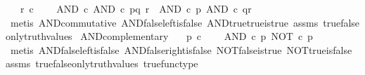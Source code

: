 \begin{isabellebody}
\ \ \ {\isachardoublequoteopen}r\ {\isasymin}\isactrlsub c\ {\isasymOmega}{\isachardoublequoteclose}\isanewline
\ \ \ {\isachardoublequoteopen}AND\ {\isasymcirc}\isactrlsub c\ {\isasymlangle}AND\ {\isasymcirc}\isactrlsub c\ {\isasymlangle}p{\isacharcomma}{\kern0pt}q{\isasymrangle}{\isacharcomma}{\kern0pt}\ r{\isasymrangle}\ {\isacharequal}{\kern0pt}\ AND\ {\isasymcirc}\isactrlsub c\ {\isasymlangle}p{\isacharcomma}{\kern0pt}\ AND\ {\isasymcirc}\isactrlsub c\ {\isasymlangle}q{\isacharcomma}{\kern0pt}r{\isasymrangle}{\isasymrangle}{\isachardoublequoteclose}\isanewline
%
\isadelimproof
\ \ %
\endisadelimproof
%
\isatagproof
{}\isamarkupfalse%
\ {\isacharparenleft}{\kern0pt}metis\ AND{\isacharunderscore}{\kern0pt}commutative\ AND{\isacharunderscore}{\kern0pt}false{\isacharunderscore}{\kern0pt}left{\isacharunderscore}{\kern0pt}is{\isacharunderscore}{\kern0pt}false\ AND{\isacharunderscore}{\kern0pt}true{\isacharunderscore}{\kern0pt}true{\isacharunderscore}{\kern0pt}is{\isacharunderscore}{\kern0pt}true\ assms\ true{\isacharunderscore}{\kern0pt}false{\isacharunderscore}{\kern0pt}only{\isacharunderscore}{\kern0pt}truth{\isacharunderscore}{\kern0pt}values{\isacharparenright}{\kern0pt}%
\endisatagproof
{\isafoldproof}%
%
\isadelimproof
\isanewline
%
\endisadelimproof
\isanewline
{}\isamarkupfalse%
\ AND{\isacharunderscore}{\kern0pt}complementary{\isacharcolon}{\kern0pt}\isanewline
\ \ \ {\isachardoublequoteopen}p\ {\isasymin}\isactrlsub c\ {\isasymOmega}{\isachardoublequoteclose}\isanewline
\ \ \ {\isachardoublequoteopen}AND\ {\isasymcirc}\isactrlsub c\ {\isasymlangle}p{\isacharcomma}{\kern0pt}\ NOT\ {\isasymcirc}\isactrlsub c\ p{\isasymrangle}\ {\isacharequal}{\kern0pt}\ \ {\isasymf}{\isachardoublequoteclose}\isanewline
%
\isadelimproof
\ \ %
\endisadelimproof
%
\isatagproof
{}\isamarkupfalse%
\ {\isacharparenleft}{\kern0pt}metis\ AND{\isacharunderscore}{\kern0pt}false{\isacharunderscore}{\kern0pt}left{\isacharunderscore}{\kern0pt}is{\isacharunderscore}{\kern0pt}false\ AND{\isacharunderscore}{\kern0pt}false{\isacharunderscore}{\kern0pt}right{\isacharunderscore}{\kern0pt}is{\isacharunderscore}{\kern0pt}false\ NOT{\isacharunderscore}{\kern0pt}false{\isacharunderscore}{\kern0pt}is{\isacharunderscore}{\kern0pt}true\ NOT{\isacharunderscore}{\kern0pt}true{\isacharunderscore}{\kern0pt}is{\isacharunderscore}{\kern0pt}false\ assms\ true{\isacharunderscore}{\kern0pt}false{\isacharunderscore}{\kern0pt}only{\isacharunderscore}{\kern0pt}truth{\isacharunderscore}{\kern0pt}values\ true{\isacharunderscore}{\kern0pt}func{\isacharunderscore}{\kern0pt}type{\isacharparenright}{\kern0pt}%

\end{isabellebody}
